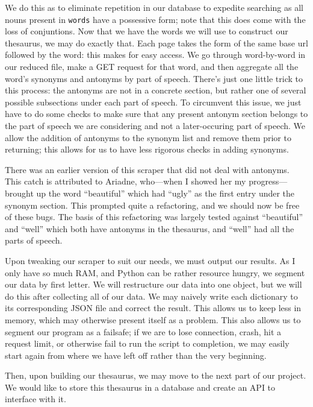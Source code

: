 \documentclass[11pt, twoside, reqno]{book}
\begin{document}
We do this as to eliminate repetition in our database to expedite searching as all nouns present in \texttt{words} have a possessive form; note that this does come with the loss of conjuntions. Now that we have the words we will use to construct our thesaurus, we may do exactly that. Each page takes the form of the same base url followed by the word: this makes for easy access. We go through word-by-word in our reduced file, make a GET request for that word, and then aggregate all the word's synonyms and antonyms by part of speech. There's just one little trick to this process: the antonyms are not in a concrete section, but rather one of several possible subsections under each part of speech. To circumvent this issue, we just have to do some checks to make sure that any present antonym section belongs to the part of speech we are considering and not a later-occuring part of speech. We allow the addition of antonyms to the synonym list and remove them prior to returning; this allows for us to have less rigorous checks in adding synonyms.

There was an earlier version of this scraper that did not deal with antonyms. This catch is attributed to Ariadne, who—when I showed her my progress—brought up the word ``beautiful'' which had ``ugly'' as the first entry under the synonym section. This prompted quite a refactoring, and we should now be free of these bugs. The basis of this refactoring was largely tested against ``beautiful'' and ``well'' which both have antonyms in the thesaurus, and ``well'' had all the parts of speech.

Upon tweaking our scraper to suit our needs, we must output our results. As I only have so much RAM, and Python can be rather resource hungry, we segment our data by first letter. We will restructure our data into one object, but we will do this after collecting all of our data. We may naively write each dictionary to its corresponding JSON file and correct the result. This allows us to keep less in memory, which may otherwise present itself as a problem. This also allows us to segment our program as a failsafe; if we are to lose connection, crash, hit a request limit, or otherwise fail to run the script to completion, we may easily start again from where we have left off rather than the very beginning.

Then, upon building our thesaurus, we may move to the next part of our project. We would like to store this thesaurus in a database and create an API to interface with it.
\end{document}
